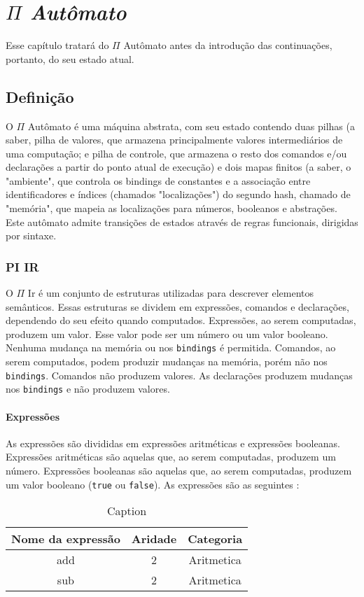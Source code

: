 \chapter{\textit{$\Pi$ Autômato}}\label{cap2}
Esse capítulo tratará do $\Pi$ Autômato antes da introdução das continuações, portanto, do seu estado atual.
\section{Definição}
O $\Pi$ Autômato é uma máquina abstrata, com seu estado contendo duas pilhas (a saber, pilha de valores, que armazena principalmente valores intermediários de uma computação; e pilha de controle, que armazena o resto dos comandos e/ou declarações a partir do ponto atual de execução) e dois mapas finitos (a saber, o "ambiente", que controla os bindings de constantes e a associação entre identificadores e índices (chamados "localizações") do segundo hash, chamado de "memória", que mapeia as localizações para números, booleanos e abstrações. Este autômato admite transições de estados através de regras funcionais, dirigidas por sintaxe.
\subsection{PI IR}
O $\Pi$ Ir é um conjunto de estruturas utilizadas para descrever elementos semânticos. Essas estruturas se dividem em expressões, comandos e declarações, dependendo do seu efeito quando computados. Expressões, ao serem computadas, produzem um valor. Esse valor pode ser um número ou um valor booleano. Nenhuma mudança na memória ou nos \texttt{bindings} é permitida. Comandos, ao serem computados, podem produzir mudanças na memória, porém não nos \texttt{bindings}. Comandos não produzem valores. As declarações produzem mudanças nos \texttt{bindings} e não produzem valores.
\subsubsection{Expressões}
As expressões são divididas em expressões aritméticas e expressões booleanas. Expressões aritméticas são aquelas que, ao serem computadas, produzem um número. Expressões booleanas são aquelas que, ao serem computadas, produzem um valor booleano (\texttt{true} ou \texttt{false}). As expressões são as seguintes : 

\begin{table}[]
    \centering
    \begin{tabular}{|c|c|c|}
    \hline
         Nome da expressão & Aridade & Categoria\\\hline\hline
         add & 2 & Aritmetica\\\hline
         sub & 2 & Aritmetica\\
    \hline
    \end{tabular}
    \caption{Caption}
    \label{tab:my_label}
\end{table}
